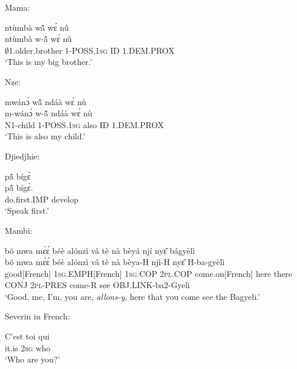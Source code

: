 \noindent Mama:

\begin{exe} 
\exC\label{87} 
  \glll  ntùmbà wã̂ wɛ́ nû \\
       ntùmbà w-ã̂ wɛ́ nû \\
         $\emptyset$1.older.brother 1-POSS.1\textsc{sg} ID 1.DEM.PROX  \\
    \trans `This is my big brother.'
\end{exe}

\noindent Nze:

\begin{exe} 
\exC\label{88} 
  \glll  mwánɔ̀ wã̂ ndáà wɛ́ nù \\
      m-wánɔ̀ w-ã̂ ndáà wɛ́ nù \\
         N1-child  1-POSS.1\textsc{sg} also ID 1.DEM.PROX  \\
    \trans `This is also my child.'
\end{exe}

\noindent Djiedjhie:

\begin{exe} 
\exC\label{89}
  \glll pã̂ bígɛ̀  \\
        pã̂ bígɛ̀.  \\
         do.first.IMP  develop \\
    \trans `Speak first.'
\end{exe}

\noindent Mambi:

\begin{exe} 
\exC\label{90}
  \glll bõ mwa mɛ́ɛ́ béè alónzì vâ tè nà bèyá njí nyɛ̂ bágyèlì \\
      bõ mwa mɛ́ɛ́ béè alónzì vâ tè nà bèya-H njì-H nyɛ̂ H-ba-gyèlì \\
         good[French] 1\textsc{sg}.EMPH[French] 1\textsc{sg}.COP 2\textsc{pl}.COP come.on[French] here there CONJ 2\textsc{pl}-PRES come-R see OBJ.LINK-ba2-Gyeli   \\
    \trans `Good, me, I'm, you are, {\itshape allons-y}, here that you come see the Bagyeli.'
\end{exe}

\noindent Severin in French:

\begin{exe} 
\exC\label{91} 
  \gll  C'est toi qui \\
         it.is 2\textsc{sg} who   \\
    \trans `Who are you?'
\end{exe}

